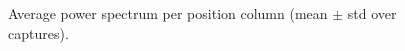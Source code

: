 \begin{figure}[t]
\centering

\caption{Average power spectrum per position column (mean $\pm$ std over captures).}
\label{fig:power_by_position_col}
\end{figure}
